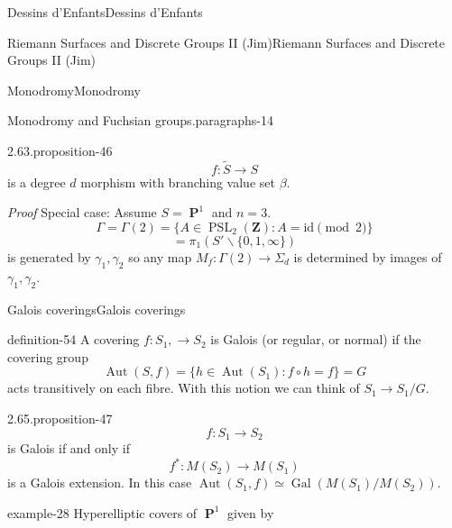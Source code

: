 \documentclass[10pt,]{book}
\makeatletter
\renewcommand*{\proofname}{Proof}
\renewenvironment{proof}[1][\proofname]{\par
  \pushQED{\qed}%
  \normalfont \topsep6\p@\@plus6\p@\relax
  \trivlist
  \item\relax
    {\itshape
    #1\@addpunct{.}}\hspace\labelsep\ignorespaces
}{%
  \popQED\endtrivlist\@endpefalse
}
\numberwithin{equation}{section}
\newcommand{\ZZ}{\mathbf{Z}}
\newcommand{\id}{\mathrm{id}}
\newcommand{\Gal}[2]{\operatorname{Gal}(#1/#2)}
\DeclareMathOperator{\PP}{\mathbf{P}}
\DeclareMathOperator{\Aut}{Aut}
\DeclareMathOperator{\PSL}{PSL}
\makeatother
\begin{document}
\begin{chapterptx}{Dessins d'Enfants}{}{Dessins d'Enfants}{}{}
\begin{sectionptx}{Riemann Surfaces and Discrete Groups II (Jim)}{}{Riemann Surfaces and Discrete Groups II (Jim)}{}{}
\begin{subsectionptx}{Monodromy}{}{Monodromy}{}{}
\begin{paragraphs}{Monodromy and Fuchsian groups.}{paragraphs-14}
\begin{proposition}{2.63.}{}{proposition-46}
\begin{equation*}
f\colon \tilde S \to S
\end{equation*}
is a degree \(d\) morphism with branching  value set \(\beta\).%
\end{proposition}
\begin{proof}\hypertarget{proof-91}{}
\hypertarget{p-584}{}%
Special case: Assume \(S = \PP^1\) and \(n=3\).%
\begin{equation*}
\Gamma = \Gamma(2) = \{ A \in \PSL_2(\ZZ) : A = \id \pmod 2\}
\end{equation*}
%
\begin{equation*}
= \pi_1 (S' \smallsetminus \{0,1,\infty\})
\end{equation*}
is generated by \(\gamma_1, \gamma_2\) so any map \(M_f \colon \Gamma(2) \to \Sigma_d\) is determined by  images of \(\gamma_1, \gamma_2\).%
\end{proof}
\end{paragraphs}%
\end{subsectionptx}
%
%
\typeout{************************************************}
\typeout{************************************************}
%
\begin{subsectionptx}{Galois coverings}{}{Galois coverings}{}{}\label{subsection-52}
\begin{definition}{}{definition-54}%
\hypertarget{p-585}{}%
A covering \(f\colon S_1,\to S_2\) is Galois (or regular, or normal) if the covering group%
\begin{equation*}
\Aut(S,f) =  \{ h\in \Aut(S_1) : f\circ h= f\} = G
\end{equation*}
acts transitively on each fibre. With this notion we can think of \(S_1 \to S_1/G\).%
\end{definition}
\begin{proposition}{2.65.}{}{proposition-47}%
\hypertarget{p-586}{}%
%
\begin{equation*}
f\colon S_1 \to S_2
\end{equation*}
is Galois if and only if%
\begin{equation*}
f^* \colon M(S_2 ) \to M(S_1)
\end{equation*}
is a Galois extension. In this case \(\Aut(S_1, f)  \simeq \Gal{M(S_1)}{M(S_2)}\).%
\end{proposition}
\begin{example}{}{example-28}%
\hypertarget{p-587}{}%
Hyperelliptic covers of \(\PP^1\) given by%
\begin{equation*}

\end{equation*}
\end{example}
\end{subsectionptx}
\end{sectionptx}
\end{chapterptx}
\end{document}
